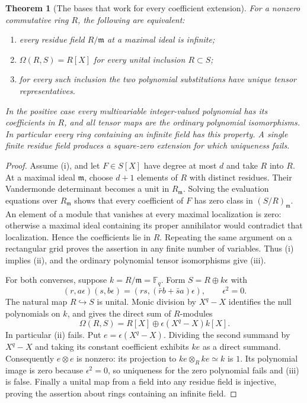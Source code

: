 \documentclass[11pt,a4paper]{article}
\newtheorem{theorem}{Theorem}[section]
\theoremstyle{definition}
\begin{document}
\begin{theorem}[The bases that work for every coefficient extension]\label{result-48}
For a nonzero commutative ring $R$, the following are equivalent:
\begin{enumerate}[label=(\roman*)]
\item every residue field $R/\mathfrak m$ at a maximal ideal is infinite;
\item $\Omega(R,S)=R[X]$ for every unital inclusion $R\subset S$;
\item for every such inclusion the two polynomial substitutions have
unique tensor representatives.
\end{enumerate}
In the positive case every multivariable integer-valued polynomial has
its coefficients in $R$, and all tensor maps are the ordinary polynomial
isomorphisms. In particular every ring containing an infinite field has
this property. A single finite residue field produces a square-zero
extension for which uniqueness fails.
\end{theorem}
\begin{proof}
Assume (i), and let $F\in S[X]$ have degree at most $d$ and take $R$
into $R$. At a maximal ideal $\mathfrak m$, choose $d+1$ elements of
$R$ with distinct residues. Their Vandermonde determinant becomes a
unit in $R_{\mathfrak m}$. Solving the evaluation equations over
$R_{\mathfrak m}$ shows that every coefficient of $F$ has zero class
in $(S/R)_{\mathfrak m}$. An element of a module that vanishes at
every maximal localization is zero: otherwise a maximal ideal
containing its proper annihilator would contradict that localization.
Hence the coefficients lie in $R$. Repeating the same argument on a
rectangular grid proves the assertion in any finite number of
variables. Thus (i) implies (ii), and the ordinary polynomial tensor
isomorphisms give (iii).

For both converses, suppose $k=R/\mathfrak m=\mathbb F_q$. Form
$S=R\oplus k\epsilon$ with
\[
 (r,a\epsilon)(s,b\epsilon)=(rs,(\bar r b+\bar s a)\epsilon),
 \qquad \epsilon^2=0.
\]
The natural map $R\hookrightarrow S$ is unital. Monic division by
$X^q-X$ identifies the null polynomials on $k$, and gives the direct
sum of $R$-modules
\[
 \Omega(R,S)=R[X]\oplus\epsilon(X^q-X)k[X].
\]
In particular (ii) fails. Put $e=\epsilon(X^q-X)$. Dividing the
second summand by $X^q-X$ and taking its constant coefficient
exhibits $ke$ as a direct summand. Consequently $e\otimes e$ is
nonzero: its projection to $ke\otimes_Rke\simeq k$ is $1$.
Its polynomial image is zero because $\epsilon^2=0$, so uniqueness
for the zero polynomial fails and (iii) is false. Finally a unital
map from a field into any residue field is injective, proving the
assertion about rings containing an infinite field.
\end{proof}
\end{document}
